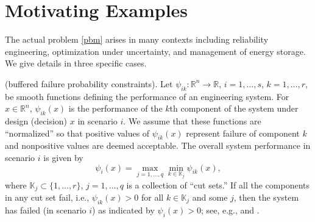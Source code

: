 \documentclass[smallextended,envcountsect]{svjour3}
\newcommand{\reals}{\mathbb{R}}
\begin{document}
\section{Motivating Examples}\label{sec:examples}

The actual problem \eqref{pbm} arises in many contexts including reliability engineering, optimization under uncertainty, and management of energy storage. We give details in three specific cases.

\begin{example}{\rm (buffered failure probability constraints).}\label{ex:buffered}
Let $\psi_{ik}:\reals^{n}\to \reals$, $i=1, \dots, s$, $k=1, \dots, r$, be smooth functions defining the performance of an engineering system. For $x\in\reals^{n}$, $\psi_{ik}(x)$ is the performance of the $k$th component of the system under design (decision) $x$ in scenario $i$. We assume that these functions are ``normalized'' so that positive values of $\psi_{ik}(x)$ represent failure of component $k$ and nonpositive values are deemed acceptable. The overall system performance in scenario $i$ is given by
\[
\psi_i(x) = \max_{j=1, \dots, q} \min_{k \in \mathbb{K}_j} \psi_{ik}(x),
\]
where $\mathbb{K}_j \subset \{1, \dots, r\}$, $j = 1, \dots, q$ is a collection of ``cut sets.'' If all the components in any cut set fail, i.e., $\psi_{ik}(x) > 0$ for all $k\in \mathbb{K}_j$ and some $j$, then the system has failed (in scenario $i$) as indicated by $\psi_i(x) > 0$; see, e.g., \cite[\S\, 6.G]{Royset_Wets_2021} and \cite{ByundeOliveiraRoyset.23}.


\end{example}
\end{document}
